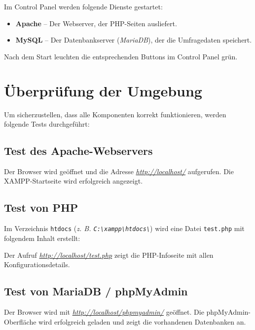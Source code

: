 Im Control Panel werden folgende Dienste gestartet:

\begin{itemize}
    \item \textbf{Apache} – Der Webserver, der \acs{PHP}-Seiten ausliefert.
    \item \textbf{My\acs{SQL}} – Der Datenbankserver (\textit{Maria\acs{DB}}), der die Umfragedaten speichert.
\end{itemize}

Nach dem Start leuchten die entsprechenden Buttons im Control Panel grün.

\section{Überprüfung der Umgebung}

Um sicherzustellen, dass alle Komponenten korrekt funktionieren, werden folgende Tests durchgeführt:

\subsection{Test des Apache-Webservers}

Der Browser wird geöffnet und die Adresse \textsl{\url{http://localhost/}} aufgerufen. Die \acs{XAMPP}-Startseite wird erfolgreich angezeigt.

\subsection{Test von \acs{PHP}}

Im Verzeichnis \texttt{\acs{htdocs}} (\textit{\acs{z. B.} \texttt{C:\textbackslash xampp\textbackslash htdocs\textbackslash}}) wird eine Datei \texttt{test.php} mit folgendem Inhalt erstellt:



Der Aufruf \textsl{\url{http://localhost/test.php}} zeigt die \acs{PHP}-Infoseite mit allen Konfigurationsdetails.

\subsection{Test von Maria\acs{DB} / phpMyAdmin}

Der Browser wird mit \textsl{\url{http://localhost/phpmyadmin/}} geöffnet. Die phpMyAdmin-Oberfläche wird erfolgreich geladen und zeigt die vorhandenen Datenbanken an.

